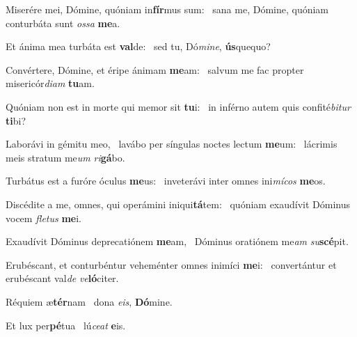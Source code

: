 \item Miserére mei, Dómine, quóniam in\textbf{fír}mus sum:~\psstar{} sana me, Dómine, quóniam conturbáta sunt \textit{os}\textit{sa} \textbf{me}a.

\item Et ánima mea turbáta est \textbf{val}de:~\psstar{} sed tu, Dó\textit{mi}\textit{ne}, \textbf{ús}quequo?

\item Convértere, Dómine, et éripe ánimam \textbf{me}am:~\psstar{} salvum me fac propter misericór\textit{di}\textit{am} \textbf{tu}am.

\item Quóniam non est in morte qui memor sit \textbf{tu}i:~\psstar{} in inférno autem quis confité\textit{bi}\textit{tur} \textbf{ti}bi?

\item Laborávi in gémitu meo,~\pscross{} la\-vábo per síngulas noctes lectum \textbf{me}um:~\psstar{} lácrimis meis stratum me\textit{um} \textit{ri}\textbf{gá}bo.

\item Turbátus est a furóre óculus \textbf{me}us:~\psstar{} inveterávi inter omnes ini\textit{mí}\textit{cos} \textbf{me}os.

\item Discédite a me, omnes, qui operámini iniqui\textbf{tá}tem:~\psstar{} quóniam exaudívit Dóminus vocem \textit{fle}\textit{tus} \textbf{me}i.

\item Exaudívit Dóminus deprecatiónem \textbf{me}am,~\psstar{} Dóminus oratiónem me\textit{am} \textit{su}\textbf{scé}pit.

\item Erubéscant, et conturbéntur veheménter omnes inimíci \textbf{me}i:~\psstar{} convertántur et erubéscant val\textit{de} \textit{ve}\textbf{ló}citer.

\item Réquiem æ\textbf{tér}nam~\psstar{} dona \textit{e}\textit{is}, \textbf{Dó}mine.

\item Et lux per\textbf{pé}tua~\psstar{} lú\textit{ce}\textit{at} \textbf{e}is.